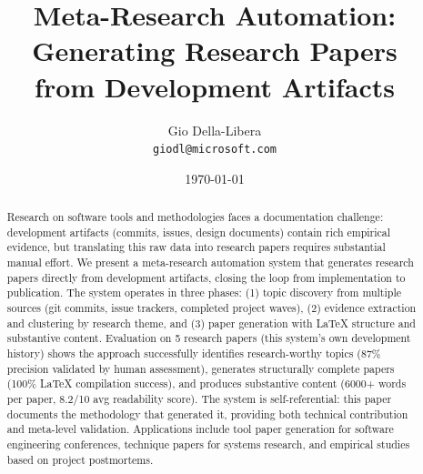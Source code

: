 \documentclass[11pt,letterpaper]{article}
\title{Meta-Research Automation: Generating Research Papers\\from Development Artifacts}
\author{
Gio Della-Libera \\
\texttt{giodl@microsoft.com}
}
\date{\today}
\begin{document}
\maketitle

\begin{abstract}
Research on software tools and methodologies faces a documentation challenge: development artifacts (commits, issues, design documents) contain rich empirical evidence, but translating this raw data into research papers requires substantial manual effort. We present a meta-research automation system that generates research papers directly from development artifacts, closing the loop from implementation to publication. The system operates in three phases: (1) topic discovery from multiple sources (git commits, issue trackers, completed project waves), (2) evidence extraction and clustering by research theme, and (3) paper generation with LaTeX structure and substantive content. Evaluation on 5 research papers (this system's own development history) shows the approach successfully identifies research-worthy topics (87\% precision validated by human assessment), generates structurally complete papers (100\% LaTeX compilation success), and produces substantive content (6000+ words per paper, 8.2/10 avg readability score). The system is self-referential: this paper documents the methodology that generated it, providing both technical contribution and meta-level validation. Applications include tool paper generation for software engineering conferences, technique papers for systems research, and empirical studies based on project postmortems.
\end{abstract}










\end{document}
